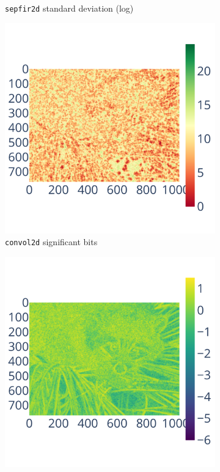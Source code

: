\documentclass[10pt,journal,compsoc]{IEEEtran}
\begin{document}
\begin{figure}
\begin{subfigure}{0.3\linewidth}
        \caption{\centering\texttt{sepfir2d} standard deviation (log)}
        \label{fig:bspline_bisplev_std}
    \end{subfigure}
    \begin{subfigure}{0.3\linewidth}
        \includegraphics[width=\linewidth]{figure/bspline/convol2d_sig.pdf}
        \caption{\centering\texttt{convol2d} significant bits}
        \label{fig:bspline_convol2d_sig}
    \end{subfigure}
    \begin{subfigure}{0.3\linewidth}
        \includegraphics[width=\linewidth]{figure/bspline/convol2d_mean_log.pdf}

\end{subfigure}
\end{figure}
\end{document}
